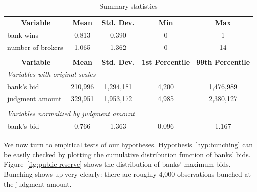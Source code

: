 \documentclass[11pt,twopage]{article}
\begin{document}
\begin{table}[!htbp]
  \centering \caption{Summary statistics \label{sumstat}}
  \begin{tabular}{lcccc}
    &&&&\\
    \hline
    \multicolumn{1}{c}{\textbf{Variable}}&\textbf{Mean}  & \textbf{Std. Dev.} 
    & \textbf{Min}& \textbf{Max} \tabularnewline
    \hline
    bank wins & 0.813 & 0.390 & 0 & 1 \\
    number of brokers & 1.065 & 1.362 & 0 & 14 \\


    &&&&\\
    \hline
    \multicolumn{1}{c}{\textbf{Variable}}&\textbf{Mean}  & \textbf{Std. Dev.} 
    & \textbf{1st Percentile}& \textbf{99th Percentile} \tabularnewline
    \hline
    \multicolumn{3}{l}{\textit{Variables with original scales}}&&\\

    bank's bid & 210,996 & 1,294,181 & 4,200 & 1,476,989 \\
    judgment amount & 329,951 & 1,953,172 & 4,985 & 2,380,127 \\

    &&&&\\
    \multicolumn{3}{l}{\textit{Variables normalized by judgment amount}}&&\\

    bank's bid & 0.766 & 1.363 & 0.096 & 1.167 \\
    \hline
  \end{tabular}
\end{table}

We now turn to empirical tests of our hypotheses. Hypothesis~\ref{hyp:bunching} can be easily checked by plotting the
cumulative distribution function of banks'
bids. Figure~\ref{fig:public-reserve} shows the distribution of banks'
maximum bids. Bunching shows up very clearly: there are roughly 4,000
observations bunched at the judgment amount.
\end{document}
